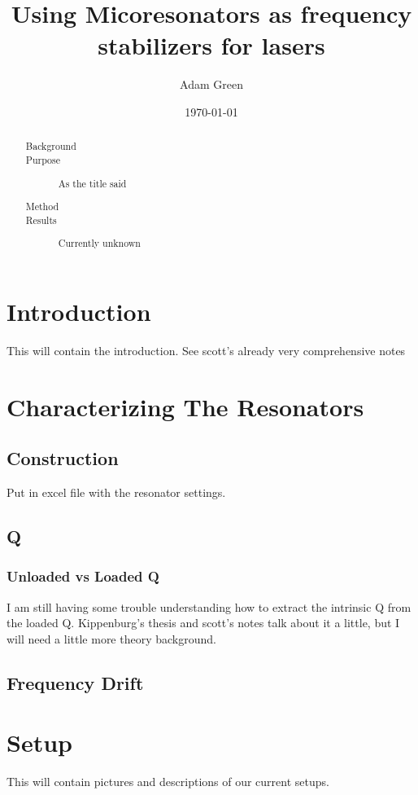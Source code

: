 \documentclass[reprint]{revtex4-1}
\begin{document}
\title{Using Micoresonators as frequency stabilizers for lasers}
\date{\today}
\author{Adam Green}

\begin{abstract}
\begin{description}
\item[Background]
\item[Purpose] As the title said
\item[Method]
\item[Results] Currently unknown
\end{description}
\end{abstract}

\maketitle

\section*{\label{sec:intro}Introduction}
This will contain the introduction. See scott's already very comprehensive notes

\section*{Characterizing The Resonators}
\subsection*{Construction}
Put in excel file with the resonator settings.
\subsection*{Q}
\subsubsection*{Unloaded vs Loaded Q}
I am still having some trouble understanding how to extract the intrinsic Q from the loaded Q. Kippenburg's thesis and scott's notes talk about it a little, but I will need a little more theory background.
\subsection*{Frequency Drift}

\section*{Setup}
This will contain pictures and descriptions of our current 
setups.
\end{document}
